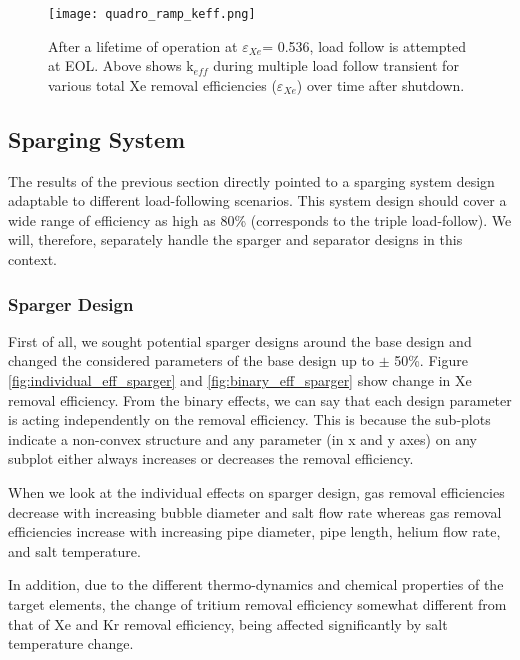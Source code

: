    \begin{figure}[htbp!]
        \begin{center}
            \texttt{[image: quadro\_ramp\_keff.png]}
        \end{center}
        \caption{After a lifetime of operation at $\varepsilon$$_{Xe}$= 0.536, 
            load follow is attempted at EOL. Above shows  k$_{eff}$ during 
            multiple load follow transient for various total Xe removal 
            efficiencies
        ($\varepsilon$$_{Xe}$) over time after shutdown.}
        \label{fig:quadro_keff}
    \end{figure}

\FloatBarrier

\subsection{Sparging System}

    The results of the previous section directly pointed to a sparging system 
    design adaptable to different load-following scenarios. This system design 
    should cover a wide range of efficiency as high as 80\% (corresponds to the 
    triple load-follow). We will, therefore, separately handle the sparger and 
    separator designs in this context.

\subsubsection{Sparger Design}

    First of all, we sought potential sparger designs around the base design 
    and changed the considered parameters of the base design up to $\pm$ 50\%. 
    Figure \ref{fig:individual_eff_sparger} and \ref{fig:binary_eff_sparger} 
    show change in Xe removal efficiency. From the binary effects, we can say 
    that each design parameter is acting independently on the removal 
    efficiency. This is because the sub-plots indicate a non-convex structure 
    and any parameter (in x and y axes) on any subplot either always increases 
    or decreases the removal efficiency.

    When we look at the individual effects on sparger design, gas removal 
    efficiencies decrease with increasing bubble diameter and salt flow rate 
    whereas gas removal efficiencies increase with increasing pipe diameter, 
    pipe length, helium flow rate, and salt temperature.

    In addition, due to the different thermo-dynamics and chemical properties 
    of the target elements, the change of tritium removal efficiency somewhat 
    different from that of Xe and Kr removal efficiency, being affected 
    significantly by salt temperature change.

